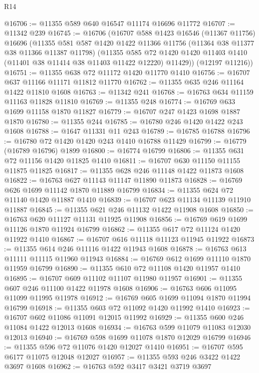 \begin{lexlean}{R14}
\begin{coremodule}
@16706 := @11355 @589 @640 @16547 @11174 @16696 @11772
@16707 := @11342 @239
@16745 := @16706
    (@16707
      @588
      @1423
      @16546
      (@11367 @11756)
      @16696
      (@11355
        @581
        @587
        @1420
        @1422
        @11366
        @11756
        (@11364 @38 @11377 @38 @11366 @11387 @11798)
        (@11355
          @585
          @72
          @1420
          @1420
          @11403
          @1410
          (@11401 @38 @11414 @38 @11403 @11422 @12220)
          @11429))
      (@12197 @11216))
@16751 := @11355 @638 @72 @11172 @1420 @11770 @1410
@16756 := @16707 @637 @11166 @11171 @11812 @11770
@16762 := @11355 @635 @246 @11164 @1422 @11810 @1608
@16763 := @11342 @241
@16768 := @16763 @634 @11159 @11163 @11828 @11810
@16769 := @11355 @248
@16774 := @16769 @633 @1699 @11158 @1870 @11827
@16779 := @16707 @247 @1423 @1698 @1887 @1870
@16780 := @11355 @244
@16785 := @16780 @246 @1420 @1422 @243 @1608
@16788 := @1647 @11331 @11 @243
@16789 := @16785 @16788
@16796 := @16780 @72 @1420 @1420 @243 @1410 @16788 @11429
@16799 := @16779 (@16789 @16796) @1899
@16800 := @16774 @16799
@16806 := @11355 @631 @72 @11156 @1420 @11825 @1410
@16811 := @16707 @630 @11150 @11155 @11875 @11825
@16817 := @11355 @628 @246 @11148 @1422 @11873 @1608
@16822 := @16763 @627 @11143 @11147 @11890 @11873
@16828 := @16769 @626 @1699 @11142 @1870 @11889 @16799
@16834 := @11355 @624 @72 @11140 @1420 @11887 @1410
@16839 := @16707 @623 @11134 @11139 @11910 @11887
@16845 := @11355 @621 @246 @11132 @1422 @11908 @1608
@16850 := @16763 @620 @11127 @11131 @11925 @11908
@16856 := @16769 @619 @1699 @11126 @1870 @11924 @16799
@16862 := @11355 @617 @72 @11124 @1420 @11922 @1410
@16867 := @16707 @616 @11118 @11123 @11945 @11922
@16873 := @11355 @614 @246 @11116 @1422 @11943 @1608
@16878 := @16763 @613 @11111 @11115 @11960 @11943
@16884 := @16769 @612 @1699 @11110 @1870 @11959 @16799
@16890 := @11355 @610 @72 @11108 @1420 @11957 @1410
@16895 := @16707 @609 @11102 @11107 @11980 @11957
@16901 := @11355 @607 @246 @11100 @1422 @11978 @1608
@16906 := @16763 @606 @11095 @11099 @11995 @11978
@16912 := @16769 @605 @1699 @11094 @1870 @11994 @16799
@16918 := @11355 @603 @72 @11092 @1420 @11992 @1410
@16923 := @16707 @602 @11086 @11091 @12015 @11992
@16929 := @11355 @600 @246 @11084 @1422 @12013 @1608
@16934 := @16763 @599 @11079 @11083 @12030 @12013
@16940 := @16769 @598 @1699 @11078 @1870 @12029 @16799
@16946 := @11355 @596 @72 @11076 @1420 @12027 @1410
@16951 := @16707 @595 @6177 @11075 @12048 @12027
@16957 := @11355 @593 @246 @3422 @1422 @3697 @1608
@16962 := @16763 @592 @3417 @3421 @3719 @3697

\end{coremodule}
\end{lexlean}
